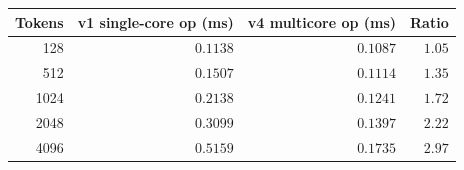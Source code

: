 \begin{tabular}{rrrr}
\toprule
Tokens & v1 single-core op (ms) & v4 multicore op (ms) & Ratio \\
\midrule
128 & $0.1138$ & $0.1087$ & $1.05$ \\
512 & $0.1507$ & $0.1114$ & $1.35$ \\
1024 & $0.2138$ & $0.1241$ & $1.72$ \\
2048 & $0.3099$ & $0.1397$ & $2.22$ \\
4096 & $0.5159$ & $0.1735$ & $2.97$ \\
\bottomrule
\end{tabular}
